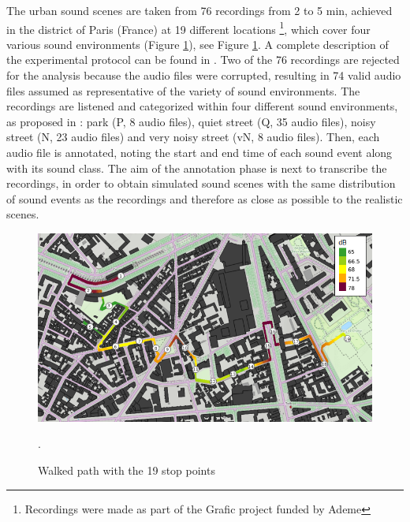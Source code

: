 \documentclass[review,5p,twocolumn,sort&compress,times]{elsarticle}
\begin{document}
The urban sound scenes are taken from 76 recordings from 2 to 5 min, achieved in the  district of Paris (France) at 19 different locations \footnote{Recordings were made as part of the Grafic project funded by Ademe}, which cover four various sound environments (Figure \ref{fig:map_grafic}), see Figure \ref{fig:map_grafic}. A complete description of the experimental protocol can be found in \cite{aumond_modelling_2017}. Two of the 76 recordings are rejected for the analysis because the audio files were corrupted, resulting in 74 valid audio files assumed as representative of the variety of sound environments. The recordings are listened and categorized within four different sound environments, as proposed in \cite{can_describing_2015}: park (P, 8 audio files), quiet street (Q, 35 audio files), noisy street (N, 23 audio files) and very noisy street (vN, 8 audio files). Then, each audio file is annotated, noting the start and end time of each sound event along with its sound class. The aim of the annotation phase is next to transcribe the recordings, in order to obtain simulated sound scenes with the same distribution of sound events as the recordings and therefore as close as possible to the realistic scenes. 

\begin{figure}[t]
\centering
\includegraphics[width=\linewidth]{./figures/trajet_19pts.png}
\caption{Walked path with the 19 stop points  \cite{aumond_modelling_2017}}.
\label{fig:map_grafic}
\end{figure}
\end{document}
